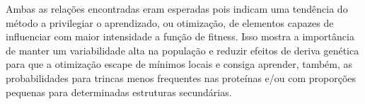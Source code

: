 Ambas as relações encontradas eram esperadas pois indicam uma tendência do método a privilegiar o aprendizado, ou otimização, de elementos capazes de influenciar com maior intensidade a função de fitness. Isso mostra a importância de manter um variabilidade alta na população e reduzir efeitos de deriva genética para que a otimização escape de mínimos locais e consiga aprender, também, as probabilidades para trincas menos frequentes nas proteínas e/ou com proporções pequenas para determinadas estruturas secundárias.





